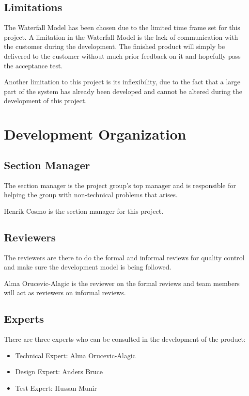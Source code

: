 \documentclass[a4paper]{article}
\begin{document}
\subsection{Limitations}
The Waterfall Model has been chosen due to the limited time frame set for this project. A limitation in the Waterfall Model is the lack of communication with the customer during the development. The finished product will simply be delivered to the customer without much prior feedback on it and hopefully pass the acceptance test.

Another limitation to this project is its inflexibility, due to the fact that a large part of the system has already been developed and cannot be altered during the development of this project.

\section{Development Organization}

\subsection{Section Manager}
The section manager is the project group's top manager and is responsible for helping the group with non-technical problems that arises.

Henrik Cosmo is the section manager for this project.

\subsection{Reviewers}
The reviewers are there to do the formal and informal reviews for quality control and make sure the development model is being followed.

Alma Orucevic-Alagic is the reviewer on the formal reviews and team members will act as reviewers on informal reviews.

\subsection{Experts}
There are three experts who can be consulted in the development of the product:
\begin{itemize}
\item Technical Expert: Alma Orucevic-Alagic
\item Design Expert: Anders Bruce
\item Test Expert: Hussan Munir
\end{itemize}
\end{document}
